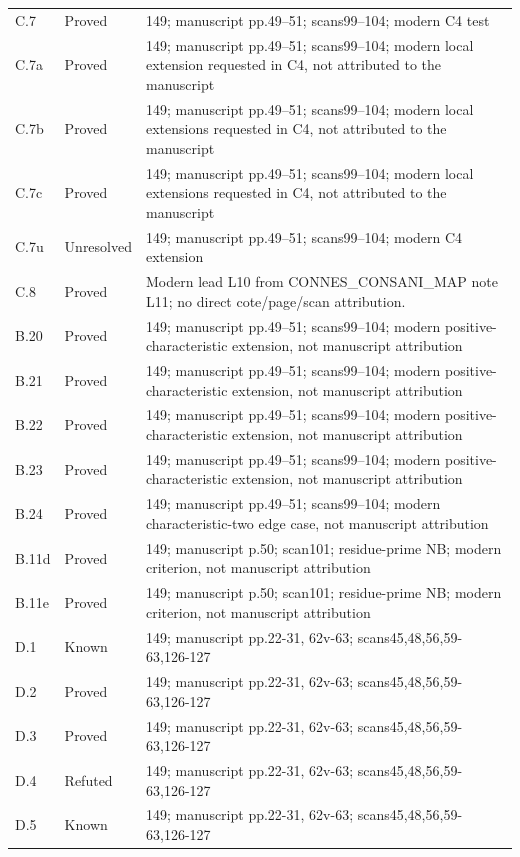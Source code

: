 {\begin{longtable}{p{1.9cm}p{1.7cm}p{10.3cm}}
C.7 & Proved & 149; manuscript pp.49–51; scans99–104; modern C4 test \\
C.7a & Proved & 149; manuscript pp.49–51; scans99–104; modern local extension requested in C4, not attributed to the manuscript \\
C.7b & Proved & 149; manuscript pp.49–51; scans99–104; modern local extensions requested in C4, not attributed to the manuscript \\
C.7c & Proved & 149; manuscript pp.49–51; scans99–104; modern local extensions requested in C4, not attributed to the manuscript \\
C.7u & Unresolved & 149; manuscript pp.49–51; scans99–104; modern C4 extension \\
C.8 & Proved & Modern lead L10 from CONNES\_CONSANI\_MAP note L11; no direct cote/page/scan attribution. \\
B.20 & Proved & 149; manuscript pp.49–51; scans99–104; modern positive-characteristic extension, not manuscript attribution \\
B.21 & Proved & 149; manuscript pp.49–51; scans99–104; modern positive-characteristic extension, not manuscript attribution \\
B.22 & Proved & 149; manuscript pp.49–51; scans99–104; modern positive-characteristic extension, not manuscript attribution \\
B.23 & Proved & 149; manuscript pp.49–51; scans99–104; modern positive-characteristic extension, not manuscript attribution \\
B.24 & Proved & 149; manuscript pp.49–51; scans99–104; modern characteristic-two edge case, not manuscript attribution \\
B.11d & Proved & 149; manuscript p.50; scan101; residue-prime NB; modern criterion, not manuscript attribution \\
B.11e & Proved & 149; manuscript p.50; scan101; residue-prime NB; modern criterion, not manuscript attribution \\
D.1 & Known & 149; manuscript pp.22-31, 62v-63; scans45,48,56,59-63,126-127 \\
D.2 & Proved & 149; manuscript pp.22-31, 62v-63; scans45,48,56,59-63,126-127 \\
D.3 & Proved & 149; manuscript pp.22-31, 62v-63; scans45,48,56,59-63,126-127 \\
D.4 & Refuted & 149; manuscript pp.22-31, 62v-63; scans45,48,56,59-63,126-127 \\
D.5 & Known & 149; manuscript pp.22-31, 62v-63; scans45,48,56,59-63,126-127 \\

\end{longtable}}
